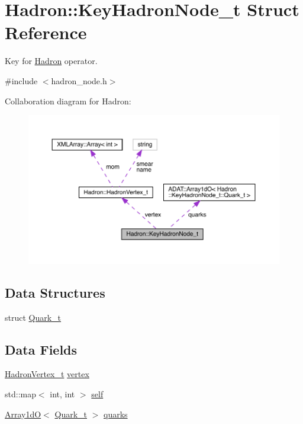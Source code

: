 \hypertarget{structHadron_1_1KeyHadronNode__t}{}\section{Hadron\+:\+:Key\+Hadron\+Node\+\_\+t Struct Reference}
\label{structHadron_1_1KeyHadronNode__t}


Key for \mbox{\hyperlink{namespaceHadron}{Hadron}} operator.  




{\ttfamily \#include $<$hadron\+\_\+node.\+h$>$}



Collaboration diagram for Hadron\+:\nopagebreak
\begin{figure}[H]
\begin{center}
\leavevmode
\includegraphics[width=350pt]{da/d68/structHadron_1_1KeyHadronNode__t__coll__graph}
\end{center}
\end{figure}
\subsection*{Data Structures}
\begin{DoxyCompactItemize}
\item 
struct \mbox{\hyperlink{structHadron_1_1KeyHadronNode__t_1_1Quark__t}{Quark\+\_\+t}}
\end{DoxyCompactItemize}
\subsection*{Data Fields}
\begin{DoxyCompactItemize}
\item 
\mbox{\hyperlink{structHadron_1_1HadronVertex__t}{Hadron\+Vertex\+\_\+t}} \mbox{\hyperlink{structHadron_1_1KeyHadronNode__t_a3a89174f6f6abadc81a35f9555530098}{vertex}}
\item 
std\+::map$<$ int, int $>$ \mbox{\hyperlink{structHadron_1_1KeyHadronNode__t_a0993d215a770b56b86e8158325dd0538}{self}}
\item 
\mbox{\hyperlink{classADAT_1_1Array1dO}{Array1dO}}$<$ \mbox{\hyperlink{structHadron_1_1KeyHadronNode__t_1_1Quark__t}{Quark\+\_\+t}} $>$ \mbox{\hyperlink{structHadron_1_1KeyHadronNode__t_a9bc87b9f4f298a6492714dfa94181055}{quarks}}
\end{DoxyCompactItemize}


